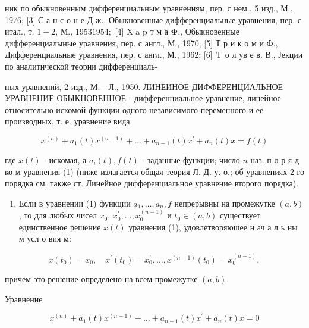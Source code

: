 \documentclass[10pt]{article}
\begin{document}
ник по обыкновенным дифференциальным уравнениям, пер. с нем., 5 изд., М., 1976; [3] С а н с о н е Д ж., Обыкновенные дифференциальные уравнения, пер. с итал., т. $1-2$, М., 1953$1954 ;$ [4] X a p т м а $\mathbf{\Phi}$., Обыкновенные дифференциалыные уравнения, пер. с англ., М., 1970; [5] Т р и к о м и Ф., Дифференциальные уравнения, пер. с англ., М., 1962; [6] 'Г о л ув е в. В., Јекции по аналитической теории дифференциаль-

ных уравнений, 2 изд., М. - Л., 1950. ЛИНЕИНОЕ ДИФФЕРЕНЦИАЛЬНОЕ УРАВНЕНИЕ ОБЫКНОВЕННОЕ - дифференциальное уравнение, линейное относительно искомой функции одного независимого переменного и ее производных, т. е. уравнение вида



\[

x^{(n)}+a_{1}(t) x^{(n-1)}+\ldots+a_{n-1}(t) x^{\prime}+a_{n}(t) x=f(t)

\]



где $x(t)$ - искомая, а $a_{i}(t), f(t)$ - заданные функции; число $n$ наз. п о р я д ко м уравнения (1) (ниже излагается общая теория Л. Д. у. о.; об уравнениях 2-го порядка см. также ст. Линейное дифференциальное уравнение второго порядка).



\begin{enumerate}

  \item Если в уравнении (1) функции $a_{1}, \ldots, a_{n}, f$ непрерывны на промежутке $(a, b)$, то для любых чисел $x_{0}$, $x_{0}^{\prime}, \ldots, x_{0}^{(n-1)}$ и $t_{0} \in(a, b)$ существует единственное решение $x(t)$ уравнения (1), удовлетворяюшее н ач а л ь ны м усл о вия м:

\end{enumerate}



\[

x\left(t_{0}\right)=x_{0}, \quad x^{\prime}\left(t_{0}\right)=x_{0}^{\prime}, \ldots, x^{(n-1)}\left(t_{0}\right)=x_{0}^{(n-1)},

\]



причем это решение определено на всем промежутке $(a, b)$.



Уравнение



\[

x^{(n)}+a_{1}(t) x^{(n-1)}+\ldots+a_{n-1}(t) x^{\prime}+a_{n}(t) x=0

\]
\end{document}
